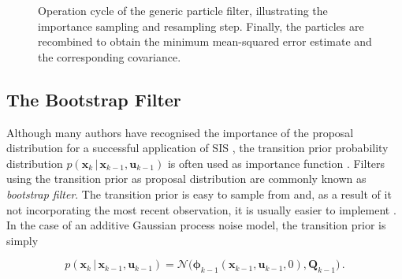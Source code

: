 \begin{figure}
\caption[Operation cycle of the generic particle filter.]{Operation cycle of the generic particle filter, illustrating the importance sampling and resampling step. Finally, the particles are recombined to obtain the minimum mean-squared error estimate and the corresponding covariance.} \label{fig:particle_filter_cycle}
\end{figure}



\subsection{The Bootstrap Filter}\label{sec:bootstrap_filter}

Although many authors have recognised the importance of the proposal distribution for a successful application of SIS \cite{doucet2000sequential, liu1998sequential, lenser2000sensor}, the transition prior probability distribution  $p(\bm{x}_k\,|\,\bm{x}_{k-1}, \bm{u}_{k-1})$ is often used as importance function \cite{avitzour1995stochastic, gordon1993novel, beadle1997fast, isard1996contour, kitagawa1996monte}. Filters using the transition prior as proposal distribution are commonly known as \emph{bootstrap filter}. The transition prior is easy to sample from and, as a result of it not incorporating the most recent observation, it is usually easier to implement \cite{doucet1998sequential, liu1998sequential, berzuini1997dynamic}. In the case of an additive Gaussian process noise model, the transition prior is simply

\begin{equation}\label{eq:weights_recursive_simplified}
  p(\bm{x}_k\,|\,\bm{x}_{k-1}, \bm{u}_{k-1}) = \mathcal{N}\big(\bm{\phi}_{k-1}(\bm{x}_{k-1}, \bm{u}_{k-1}, 0), \bm{Q}_{k-1}\big)\,.
\end{equation}



